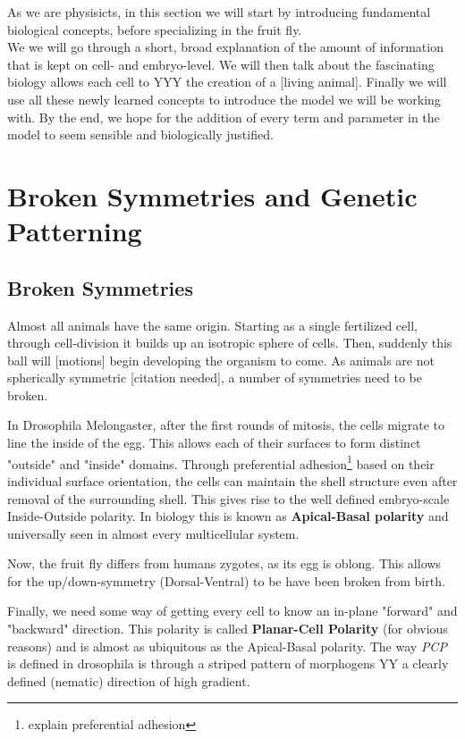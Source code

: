 As we are physisicts, in this section we will start by introducing fundamental biological concepts, before specializing in the fruit fly. \\
We we will go through a short, broad explanation of the amount of information that is kept on cell- and embryo-level. We will then talk about the fascinating biology allows each cell to YYY the creation of a [living animal]. Finally we will use all these newly learned concepts to introduce the model we will be working with. By the end, we hope for the addition of every term and parameter in the model to seem sensible and biologically justified. 


\section{Broken Symmetries and Genetic Patterning}
\label{sec:theory-polarity}
\subsection{Broken Symmetries}

Almost all animals have the same origin. Starting as a single fertilized cell, through cell-division it builds up an isotropic sphere of cells. Then, suddenly this ball will [motions] begin developing the organism to come. As animals are not spherically symmetric [citation needed], a number of symmetries need to be broken. 

In Drosophila Melongaster, after the first rounds of mitosis, the cells migrate to line the inside of the egg. This allows each of their surfaces to form distinct "outside" and "inside" domains. Through preferential adhesion\footnote{explain preferential adhesion} based on their individual surface orientation, the cells can maintain the shell structure even after removal of the surrounding shell. This gives rise to the well defined embryo-scale Inside-Outside polarity. In biology this is known as \textbf{Apical-Basal polarity} and universally seen in almost every multicellular system. 

Now, the fruit fly differs from humans zygotes, as its egg is oblong. This allows for the up/down-symmetry (Dorsal-Ventral) to be have been broken from birth. \reph 

Finally, we need some way of getting every cell to know an in-plane "forward" and "backward" direction. This polarity is called \textbf{Planar-Cell Polarity} (for obvious reasons) and is almost as ubiquitous as the Apical-Basal polarity. The way  \textit{PCP} is defined in drosophila is through a striped pattern of morphogens YY a clearly defined (nematic) direction of high gradient.

